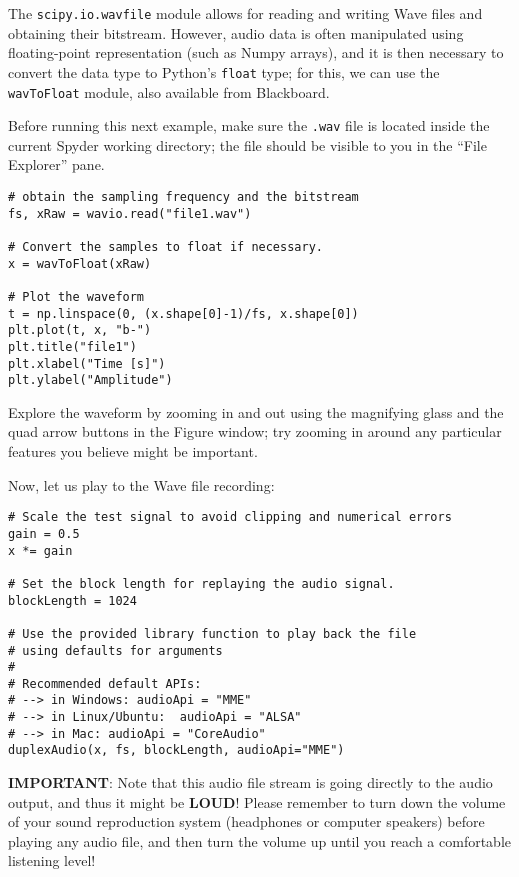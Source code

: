 The {\tt scipy.io.wavfile} module allows for reading and writing Wave files and obtaining their bitstream. However, audio data is often manipulated using floating-point representation (such as Numpy arrays), and it is then necessary to convert the data type to Python's {\tt float} type; for this, we can use the {\tt wavToFloat} module, also available from Blackboard.

Before running this next example, make sure the {\tt .wav} file is located inside the current Spyder working directory; the file should be visible to you in the ``File Explorer'' pane.

\begin{lstlisting}[frame=single]
# obtain the sampling frequency and the bitstream
fs, xRaw = wavio.read("file1.wav")

# Convert the samples to float if necessary.
x = wavToFloat(xRaw)

# Plot the waveform
t = np.linspace(0, (x.shape[0]-1)/fs, x.shape[0])
plt.plot(t, x, "b-")
plt.title("file1")
plt.xlabel("Time [s]")
plt.ylabel("Amplitude")
\end{lstlisting}

Explore the waveform by zooming in and out using the magnifying glass and the quad arrow buttons in the Figure window; try zooming in around any particular features you believe might be important.

Now, let us play to the Wave file recording:

\begin{lstlisting}[frame=single]
# Scale the test signal to avoid clipping and numerical errors
gain = 0.5
x *= gain

# Set the block length for replaying the audio signal.
blockLength = 1024

# Use the provided library function to play back the file
# using defaults for arguments
#
# Recommended default APIs:
# --> in Windows: audioApi = "MME"
# --> in Linux/Ubuntu:  audioApi = "ALSA"
# --> in Mac: audioApi = "CoreAudio"
duplexAudio(x, fs, blockLength, audioApi="MME")
\end{lstlisting}

\textbf{IMPORTANT}: Note that this audio file stream is going directly to the audio output, and thus it might be \textbf{LOUD}! Please remember to turn down the volume of your sound reproduction system (headphones or computer speakers) before playing any audio file, and then turn the volume up until you reach a comfortable listening level!

